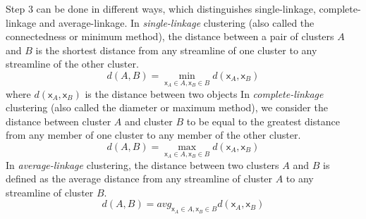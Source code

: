 Step $3$ can be done in different ways, which distinguishes single-linkage, complete-linkage and average-linkage.
In \emph{single-linkage} clustering (also called the connectedness or minimum method), the distance between a pair of clusters $A$ and $B$ is the shortest distance from any streamline of one cluster to any streamline of the other cluster. 
\begin{equation}
\label{eq:distance_single_linkage}
d(A, B) = \min_{\mathsf{x}_A \in {A},\mathsf{x}_B \in {B}} d(\mathsf{x}_A,\mathsf{x}_B)
\end{equation}
where $d(\mathsf{x}_A,\mathsf{x}_B)$ is the distance between two objects
In \emph{complete-linkage} clustering (also called the diameter or maximum method), we consider the distance between cluster $A$ and cluster $B$ to be equal to the greatest distance from any member of one cluster to any member of the other cluster.
\begin{equation}
\label{eq:distance_complete_linkage}
d(A, B) = \max_{\mathsf{x}_A \in {A},\mathsf{x}_B \in {B}} d(\mathsf{x}_A,\mathsf{x}_B)
\end{equation}
In \emph{average-linkage} clustering, the distance between two clusters $A$ and $B$ is defined as the average distance from any streamline of cluster $A$ to any streamline of cluster $B$.
\begin{equation}
\label{eq:distance_average_linkage}
d(A, B) = avg_{\mathsf{x}_A \in {A},\mathsf{x}_B \in {B}} d(\mathsf{x}_A,\mathsf{x}_B)
\end{equation}

